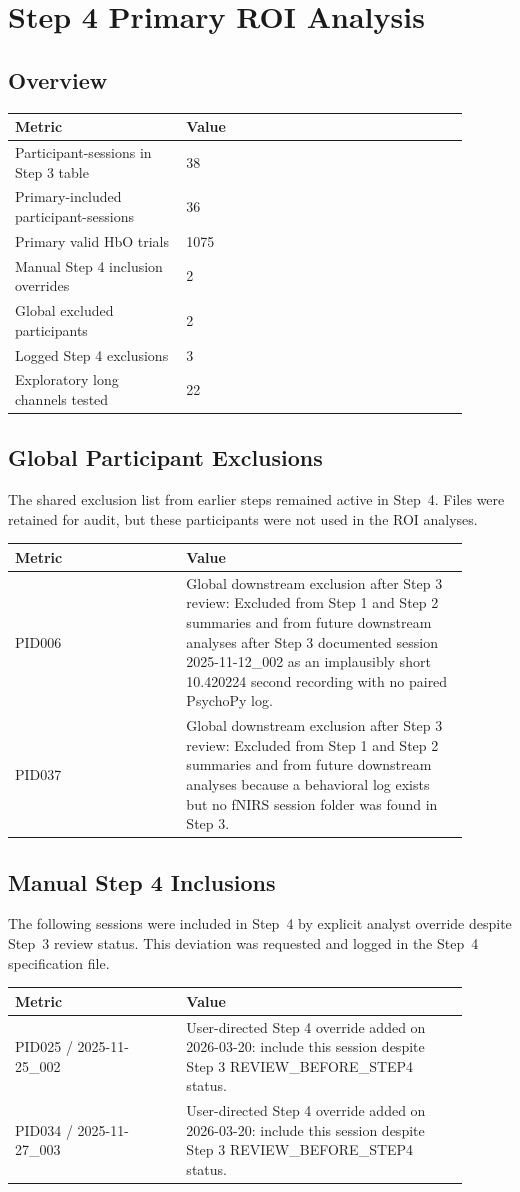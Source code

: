 \documentclass[11pt]{article}
\begin{document}
\section*{Step 4 Primary ROI Analysis}
\subsection*{Overview}
\begin{tabular}{p{0.34\linewidth}p{0.56\linewidth}}
\toprule
Metric & Value\\
\midrule
Participant-sessions in Step 3 table & 38\\
Primary-included participant-sessions & 36\\
Primary valid HbO trials & 1075\\
Manual Step 4 inclusion overrides & 2\\
Global excluded participants & 2\\
Logged Step 4 exclusions & 3\\
Exploratory long channels tested & 22\\
\bottomrule
\end{tabular}
\subsection*{Global Participant Exclusions}
The shared exclusion list from earlier steps remained active in Step~4. Files were retained for audit, but these participants were not used in the ROI analyses.
\begin{tabular}{p{0.34\linewidth}p{0.56\linewidth}}
\toprule
Metric & Value\\
\midrule
PID006 & Global downstream exclusion after Step 3 review: Excluded from Step 1 and Step 2 summaries and from future downstream analyses after Step 3 documented session 2025-11-12\_002 as an implausibly short 10.420224 second recording with no paired PsychoPy log.\\
PID037 & Global downstream exclusion after Step 3 review: Excluded from Step 1 and Step 2 summaries and from future downstream analyses because a behavioral log exists but no fNIRS session folder was found in Step 3.\\
\bottomrule
\end{tabular}
\subsection*{Manual Step 4 Inclusions}
The following sessions were included in Step~4 by explicit analyst override despite Step~3 review status. This deviation was requested and logged in the Step~4 specification file.
\begin{tabular}{p{0.34\linewidth}p{0.56\linewidth}}
\toprule
Metric & Value\\
\midrule
PID025 / 2025-11-25\_002 & User-directed Step 4 override added on 2026-03-20: include this session despite Step 3 REVIEW\_BEFORE\_STEP4 status.\\
PID034 / 2025-11-27\_003 & User-directed Step 4 override added on 2026-03-20: include this session despite Step 3 REVIEW\_BEFORE\_STEP4 status.\\
\bottomrule
\end{tabular}
\end{document}
